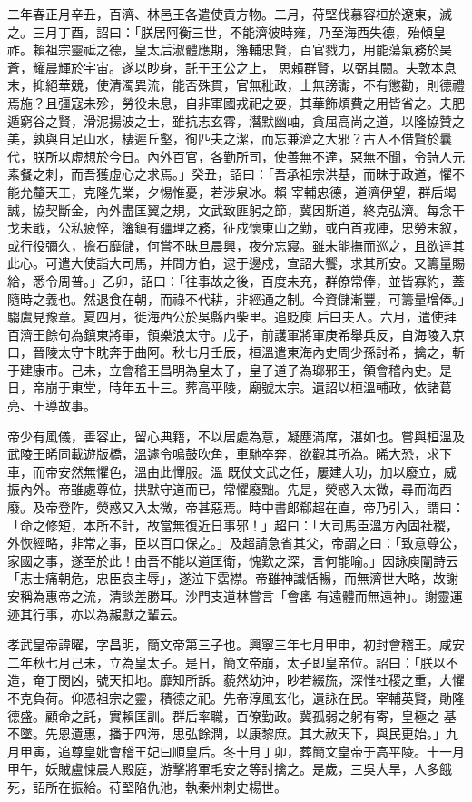 \begin{pinyinscope}
 二年春正月辛丑，百濟、林邑王各遣使貢方物。二月，苻堅伐慕容桓於遼東，滅之。三月丁酉，詔曰：「朕居阿衡三世，不能濟彼時雍，乃至海西失德，殆傾皇祚。賴祖宗靈祗之德，皇太后淑體應期，籓輔忠賢，百官戮力，用能蕩氣務於昊蒼，耀晨輝於宇宙。遂以眇身，託于王公之上，
 思賴群賢，以弼其闕。夫敦本息末，抑絕華競，使清濁異流，能否殊貫，官無秕政，士無謗讟，不有懲勸，則德禮焉施？且彊寇未殄，勞役未息，自非軍國戎祀之耍，其華飾煩費之用皆省之。夫肥遁窮谷之賢，滑泥揚波之士，雖抗志玄霄，潛默幽岫，貪屈高尚之道，以隆協贊之美，孰與自足山水，棲遲丘壑，徇匹夫之潔，而忘兼濟之大邪？古人不借賢於曩代，朕所以虛想於今日。內外百官，各勤所司，使善無不達，惡無不聞，令詩人元素餐之刺，而吾獲虛心之求焉。」癸丑，詔曰：「吾承祖宗洪基，而昧于政道，懼不能允釐天工，克隆先業，夕惕惟憂，若涉泉冰。賴
 宰輔忠德，道濟伊望，群后竭誠，協契斷金，內外盡匡翼之規，文武致匪躬之節，冀因斯道，終克弘濟。每念干戈未戢，公私疲悴，籓鎮有疆理之務，征戍懷東山之勤，或白首戎陣，忠勞未敘，或行役彌久，擔石靡儲，何嘗不昧旦晨興，夜分忘寢。雖未能撫而巡之，且欲達其此心。可遣大使詣大司馬，并問方伯，逮于邊戍，宣詔大饗，求其所安。又籌量賜給，悉令周普。」乙卯，詔曰：「往事故之後，百度未充，群僚常俸，並皆寡約，蓋隨時之義也。然退食在朝，而祿不代耕，非經通之制。今資儲漸豐，可籌量增俸。」騶虞見豫章。夏四月，徙海西公於吳縣西柴里。追貶庾
 后曰夫人。六月，遣使拜百濟王餘句為鎮東將軍，領樂浪太守。戊子，前護軍將軍庚希舉兵反，自海陵入京口，晉陵太守卞眈奔于曲阿。秋七月壬辰，桓溫遣東海內史周少孫討希，擒之，斬于建康市。己未，立會稽王昌明為皇太子，皇子道子為瑯邪王，領會稽內史。是日，帝崩于東堂，時年五十三。葬高平陵，廟號太宗。遺詔以桓溫輔政，依諸葛亮、王導故事。



 帝少有風儀，善容止，留心典籍，不以居處為意，凝塵滿席，湛如也。嘗與桓溫及武陵王晞同載遊版橋，溫遽令鳴鼓吹角，車馳卒奔，欲觀其所為。晞大恐，求下車，而帝安然無懼色，溫由此憚服。溫
 既仗文武之任，屢建大功，加以廢立，威振內外。帝雖處尊位，拱默守道而已，常懼廢黜。先是，熒惑入太微，尋而海西廢。及帝登阼，熒惑又入太微，帝甚惡焉。時中書郎郗超在直，帝乃引入，謂曰：「命之修短，本所不計，故當無復近日事邪！」超曰：「大司馬臣溫方內固社稷，外恢經略，非常之事，臣以百口保之。」及超請急省其父，帝謂之曰：「致意尊公，家國之事，遂至於此！由吾不能以道匡衛，愧歎之深，言何能喻。」因詠庾闡詩云「志士痛朝危，忠臣哀主辱」，遂泣下霑襟。帝雖神識恬暢，而無濟世大略，故謝安稱為惠帝之流，清談差勝耳。沙門支道林嘗言「會嶴
 有遠體而無遠神」。謝靈運迹其行事，亦以為赧獻之輩云。



 孝武皇帝諱曜，字昌明，簡文帝第三子也。興寧三年七月甲申，初封會稽王。咸安二年秋七月己未，立為皇太子。是日，簡文帝崩，太子即皇帝位。詔曰：「朕以不造，奄丁閔凶，號天扣地。靡知所訴。藐然幼沖，眇若綴旒，深惟社稷之重，大懼不克負荷。仰憑祖宗之靈，積德之祀。先帝淳風玄化，遺詠在民。宰輔英賢，勛隆德盛。顧命之託，實賴匡訓。群后率職，百僚勤政。冀孤弱之躬有寄，皇極之
 基不墜。先恩遺惠，播于四海，思弘餘潤，以康黎庶。其大赦天下，與民更始。」九月甲寅，追尊皇妣會稽王妃曰順皇后。冬十月丁卯，葬簡文皇帝于高平陵。十一月甲午，妖賊盧悚晨人殿庭，游擊將軍毛安之等討擒之。是歲，三吳大旱，人多餓死，詔所在振給。苻堅陷仇池，執秦州刺史楊世。




\end{pinyinscope}

